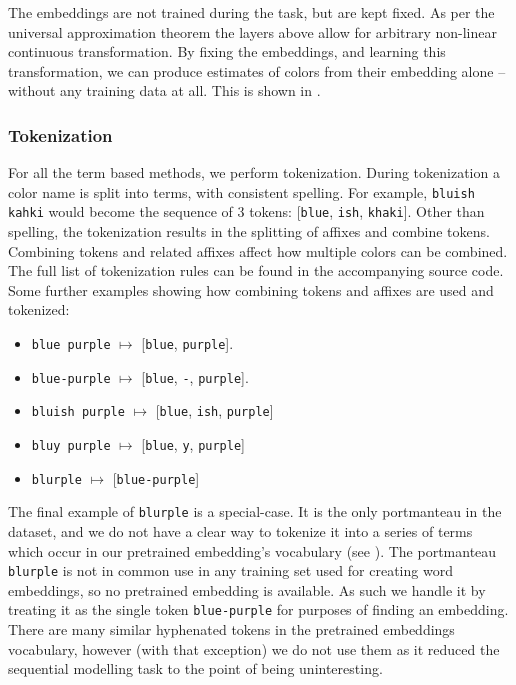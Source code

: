 \documentclass[11pt,a4paper]{article}
\newcommand{\parencite}{\citep}
\newcommand{\natlang}[1]{\texttt{#1}}
\begin{document}
The embeddings are not trained during the task, but are kept fixed.
As per the universal approximation theorem \parencite{leshno1993uat, SONODA2017uat} the layers above allow for arbitrary non-linear continuous transformation.
By fixing the embeddings, and learning this transformation,
we can produce estimates of colors from their embedding alone -- without any training data at all.
This is shown in .

\subsubsection{Tokenization}
For all the term based methods, we perform tokenization.
During tokenization a color name is split into terms, with consistent spelling.
For example, \natlang{bluish kahki} would become the sequence of 3 tokens: [\natlang{blue}, \natlang{ish}, \natlang{khaki}].
Other than spelling, the tokenization results in the splitting of affixes and combine tokens.
Combining tokens and related affixes affect how multiple colors can be combined.
The full list of tokenization rules can be found in the accompanying source code.
Some further examples showing how combining tokens and affixes are used and tokenized:
\begin{itemize}
	\item \natlang{blue purple} $\mapsto$ [\natlang{blue}, \natlang{purple}].
	\item \natlang{blue-purple} $\mapsto$ [\natlang{blue}, \natlang{-}, \natlang{purple}].
	\item \natlang{bluish purple} $\mapsto$ [\natlang{blue}, \natlang{ish}, \natlang{purple}]
	\item \natlang{bluy purple} $\mapsto$ [\natlang{blue}, \natlang{y}, \natlang{purple}]
	\item \natlang{blurple} $\mapsto$ [\natlang{blue-purple}]
\end{itemize}
The final example of \natlang{blurple} is a special-case.
It is the only portmanteau in the dataset, and we do not have a clear way to tokenize it into a series of terms which occur in our pretrained embedding's vocabulary (see ).
The portmanteau \natlang{blurple} is not in common use in any training set used for creating word embeddings, so no pretrained embedding is available.
As such we handle it by treating it as the single token \natlang{blue-purple} for purposes of finding an embedding.
There are many similar hyphenated tokens in the pretrained embeddings vocabulary, however (with that exception) we do not use them as it reduced the sequential modelling task to the point of being uninteresting.
\end{document}
